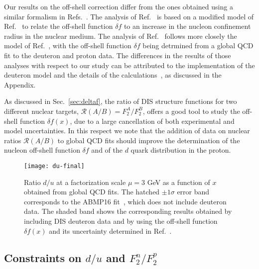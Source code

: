 \documentclass[%
      aps,
      prd,
      floatfix,
      preprintnumbers,
      preprint,
      showpacs,
      nofootinbib,
      tightenlines,
      amssymb,
      amsmath
]{revtex4-1}
\begin{document}
Our results on the off-shell correction differ from the ones obtained 
using a similar formalism in Refs.~\cite{Accardi:2011fa,Accardi:2016qay}.  
The analysis of Ref.~\cite{Accardi:2011fa} is based on a modified model of Ref.~\cite{KP04} 
to relate the off-shell function $\delta f$ to an increase in the nucleon confinement radius 
in the nuclear medium. The analysis of Ref.~\cite{Accardi:2016qay} follows more closely the 
model of Ref.~\cite{KP04}, with the off-shell function $\delta f$ being detrmined from a global 
QCD fit to the deuteron and proton data. The differences in the results of those analyses 
with respect to our study can be attributed to the implementation of the deuteron model and 
the details of the calculations~\cite{AccardiDIS16}, as discussed in the Appendix. 

As discussed in Sec.~\ref{sec:deltaf}, the ratio of DIS structure functions for two different 
nuclear targets, $\mathcal R(A/B) = F_2^A/F_2^B$, offers a good tool to  
study the off-shell function $\delta f(x)$, due to a large  
cancellation of both experimental and model uncertainties. In this respect we 
note that the addition of data on nuclear ratios $\mathcal R(A/B)$ to global QCD fits  
should improve the determination of the nucleon off-shell function $\delta f$ 
and of the $d$ quark distribution in the proton. 


\begin{figure}[htb] %
\begin{center}
\texttt{[image: du-final]}
\caption{%
Ratio $d/u$ at a factorization scale $\mu=3$ GeV as a function of $x$ 
obtained from global QCD fits. The hatched $\pm 1\sigma$ 
error band corresponds to the ABMP16 fit~\cite{Alekhin:2017kpj}, which does not include deuteron data.  
The shaded band shows the corresponding results obtained by including DIS deuteron data and by using the 
off-shell function $\delta f(x)$ and its uncertainty determined in Ref.~\cite{KP04}.  
}
\label{fig:d_u}
\end{center}
\end{figure}



\subsection{Constraints on $d/u$ and $F_2^n/F_2^p$}
\label{sec:duratio}
\end{document}
